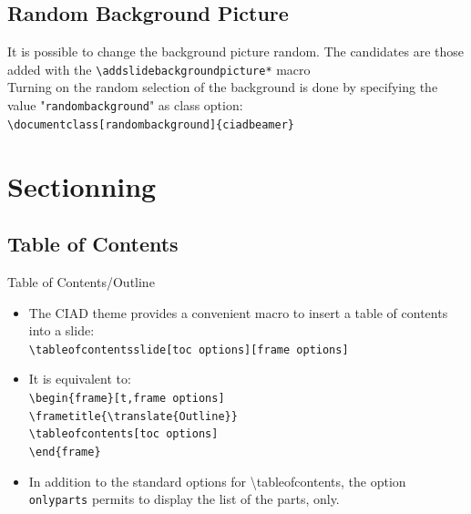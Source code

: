 \documentclass[english,sectioncirclenumberstyle]{ciadbeamer}
\begin{document}
\subsection{Random Background Picture}

\begin{frame}{\subsecname}
	It is possible to change the background picture random. The candidates are those added with the \texttt{{\textbackslash}addslidebackgroundpicture*} macro \\[.25cm]
	Turning on the random selection of the background is done by specifying the value "\texttt{randombackground}" as class option: \\[.25cm]
	\texttt{{\textbackslash}documentclass[randombackground]\{ciadbeamer\}}
\end{frame}



\section{Sectionning}
\sectiontableofcontentslide

\subsection{Table of Contents}

\begin{frame}{Table of Contents/Outline}
	\begin{itemize}
	\item The CIAD theme provides a convenient macro to insert a table of contents into a slide: \\
		\texttt{{\textbackslash}tableofcontentsslide[toc options][frame options]}
	\vspace{1em}
	\item It is equivalent to: \\
		\texttt{{\textbackslash}begin\{frame\}[t,frame options]} \\
		\texttt{{\textbackslash}frametitle\{{\textbackslash}translate\{Outline\}\}} \\
		\texttt{{\textbackslash}tableofcontents[toc options]} \\
		\texttt{{\textbackslash}end\{frame\}}
	\vspace{1em}
	\item In addition to the standard options for {{\textbackslash}tableofcontents}, the option \texttt{onlyparts} permits to display the list of the parts, only.
	\end{itemize}
\end{frame}
\end{document}
